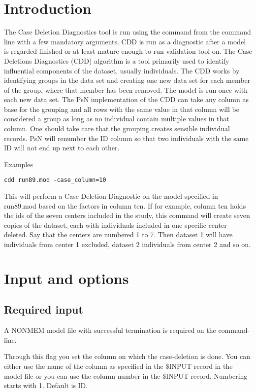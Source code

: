 



\maketitle
\newcommand{\guidetoolname}{cdd}

\section{Introduction}
The Case Deletion Diagnostics tool is run using the command from the command line with a few mandatory arguments. 
CDD is run as a diagnostic after a model is regarded finished or at least mature enough to run validation tool on. 
The Case Deletions Diagnostics (CDD) algorithm is a tool primarily used to identify influential components of the dataset, 
usually individuals. The CDD works by identifying groups in the data set and creating one new data set for each member 
of the group, where that member has been removed. The model is run once with each new data set. The PsN implementation 
of the CDD can take any column as base for the grouping and all rows with the same value in that column will be considered 
a group as long as no individual contain multiple values in that column. One should take care that the grouping creates sensible 
individual records. PsN will renumber the ID column so that two individuals with the same ID will not end up next to each other.

Examples
\begin{verbatim}
cdd run89.mod -case_column=10
\end{verbatim}
This will perform a Case Deletion Diagnostic on the model specified in run89.mod based on the factors in column ten. If for example, 
column ten holds the ids of the seven centers included in the study, this command will create seven copies of the dataset, each with 
individuals included in one specific center deleted. Say that the centers are numbered 1 to 7. Then dataset 1 will have individuals from 
center 1 excluded, dataset 2 individuals from center 2 and so on.

\section{Input and options}

\subsection{Required input}
A NONMEM model file with successful termination is required on the command-line.
\begin{optionlist}
Through this flag you set the column on which the case-deletion is done. You can either use the name of the column as specified in the 
\mbox{\$INPUT} record in the model file or you can use the column number in the \mbox{\$INPUT} record. Numbering starts with 1. 
Default is ID.
\end{optionlist}

